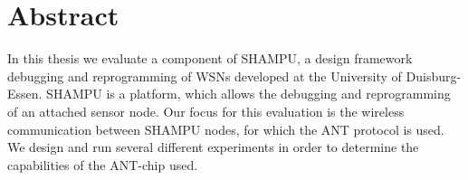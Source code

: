 
\cleardoublepage
\section*{Abstract}
In this thesis we evaluate a component of SHAMPU, a design framework debugging and reprogramming of WSNs developed at the University of Duisburg-Essen. 
SHAMPU is a platform, which allows the debugging and reprogramming of an attached sensor node.
Our focus for this evaluation is the wireless communication between SHAMPU nodes, for which the ANT protocol is used. 
We design and run several different experiments in order to determine the capabilities of the ANT-chip used.

\cleardoublepage

